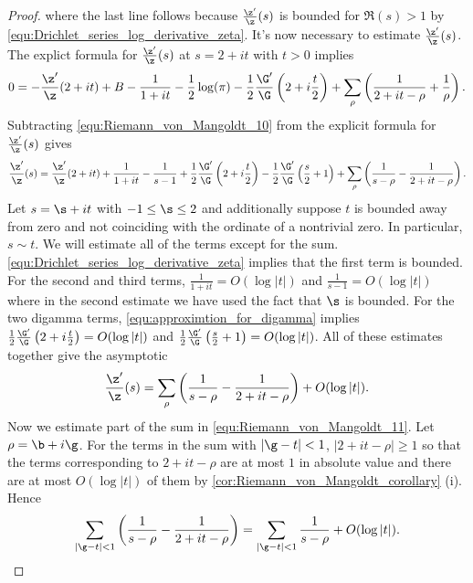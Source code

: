 \begin{proof}
        where the last line follows because $\frac{\z'}{\z}(s)$ is bounded for $\Re(s) > 1$ by \cref{equ:Drichlet_series_log_derivative_zeta}. It's now necessary to estimate $\frac{\z'}{\z}(s)$. The explict formula for $\frac{\z'}{\z}(s)$ at $s = 2+it$ with $t > 0$ implies
        \begin{equation}\label{equ:Riemann_von_Mangoldt_10}
          0 = -\frac{\z'}{\z}(2+it)+B-\frac{1}{1+it}-\frac{1}{2}\log(\pi)-\frac{1}{2}\frac{\G'}{\G}\left(2+i\frac{t}{2}\right)+\sum_{\rho}\left(\frac{1}{2+it-\rho}+\frac{1}{\rho}\right).
        \end{equation}
        Subtracting \cref{equ:Riemann_von_Mangoldt_10} from the explicit formula for $\frac{\z'}{\z}(s)$ gives
        \[
          \frac{\z'}{\z}(s) = \frac{\z'}{\z}(2+it)+\frac{1}{1+it}-\frac{1}{s-1}+\frac{1}{2}\frac{\G'}{\G}\left(2+i\frac{t}{2}\right)-\frac{1}{2}\frac{\G'}{\G}\left(\frac{s}{2}+1\right)+\sum_{\rho}\left(\frac{1}{s-\rho}-\frac{1}{2+it-\rho}\right).
        \]
        Let $s = \s+it$ with $-1 \le \s \le 2$ and additionally suppose $t$ is bounded away from zero and not coinciding with the ordinate of a nontrivial zero. In particular, $s \sim t$. We will estimate all of the terms except for the sum. \cref{equ:Drichlet_series_log_derivative_zeta} implies that the first term is bounded. For the second and third terms, $\frac{1}{1+it} = O(\log|t|)$ and $\frac{1}{s-1} = O(\log|t|)$ where in the second estimate we have used the fact that $\s$ is bounded. For the two digamma terms, \cref{equ:approximtion_for_digamma} implies $\frac{1}{2}\frac{\G'}{\G}\left(2+i\frac{t}{2}\right) = O(\log|t|)$ and $\frac{1}{2}\frac{\G'}{\G}\left(\frac{s}{2}+1\right) = O(\log|t|)$. All of these estimates together give the asymptotic
        \begin{equation}\label{equ:Riemann_von_Mangoldt_11}
          \frac{\z'}{\z}(s) = \sum_{\rho}\left(\frac{1}{s-\rho}-\frac{1}{2+it-\rho}\right)+O(\log|t|).
        \end{equation}
        Now we estimate part of the sum in \cref{equ:Riemann_von_Mangoldt_11}. Let $\rho = \b+i\g$. For the terms in the sum with $|\g-t| < 1$, $|2+it-\rho| \ge 1$ so that the terms corresponding to $2+it-\rho$ are at most $1$ in absolute value and there are at most $O(\log|t|)$ of them by \cref{cor:Riemann_von_Mangoldt_corollary} (i). Hence
        \begin{equation}\label{equ:Riemann_von_Mangoldt_12}
          \sum_{|\g-t| < 1}\left(\frac{1}{s-\rho}-\frac{1}{2+it-\rho}\right) = \sum_{|\g-t| < 1}\frac{1}{s-\rho}+O(\log|t|).
        \end{equation}

\end{proof}
